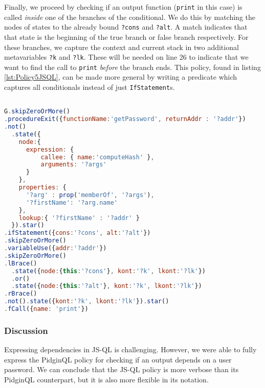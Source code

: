 Finally, we proceed by checking if an output function (\texttt{print} in this case) is called \textit{inside} one of the branches of the conditional. We do this by matching the nodes of states to the already bound \texttt{?cons} and \texttt{?alt}. A match indicates that that state is the beginning of the true branch or false branch respectively. For these branches, we capture the context and current stack in two additional metavariables \texttt{?k} and \texttt{?lk}. These will be needed on line 26 to indicate that we want to find the call to \texttt{print} \textit{before} the branch ends. This policy, found in listing \ref{lst:Policy5JSQL}, can be made more general by writing a predicate which captures all conditionals instead of just \texttt{IfStatement}s.

\begin{lstlisting}[label={lst:Policy5JSQL},language=JavaScript,caption=Policy 5 in JSQL,mathescape=true]  % float=t?

G.skipZeroOrMore()
.procedureExit({functionName:'getPassword', returnAddr : '?addr'})
.not()
  .state({
    node:{  
      expression: {
          callee: { name:'computeHash' },
          arguments: '?args'
      }
    },
    properties: {
      '?arg' : prop('memberOf', '?args'),
      '?firstName': '?arg.name'
    },
    lookup:{ '?firstName' : '?addr' }
  }).star()
.ifStatement({cons:'?cons', alt:'?alt'})
.skipZeroOrMore()
.variableUse({addr:'?addr'})
.skipZeroOrMore()
.lBrace()
  .state({node:{this:'?cons'}, kont:'?k', lkont:'?lk'})
  .or()
  .state({node:{this:'?alt'}, kont:'?k', lkont:'?lk'})
.rBrace()
.not().state({kont:'?k', lkont:'?lk'}).star()
.fCall({name: 'print'})
\end{lstlisting}
 
\subsubsection*{Discussion}
Expressing dependencies in JS-QL is challenging. However, we were able to fully express the PidginQL policy for checking if an output depends on a user password. We can conclude that the JS-QL policy is more verbose than its PidginQL counterpart, but it is also more flexible in its notation.


